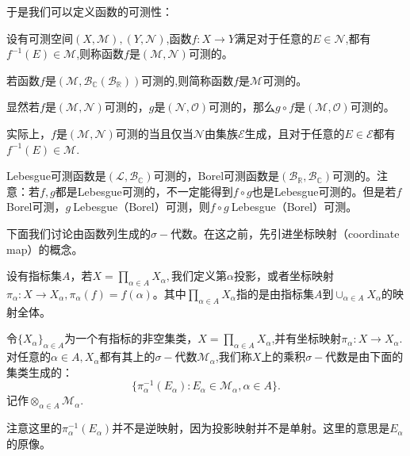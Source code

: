 \documentclass[lang=cn,10pt]{elegantbook}
\begin{document}
	于是我们可以定义函数的可测性：
	\begin{definition}[可测函数]
		设有可测空间\((X,\mathcal{M}),(Y,\mathcal{N})\),函数\(f:X\to Y\)满足对于任意的\(E\in \mathcal{N}\),都有\(f^{-1}(E)\in \mathcal{M}\),则称函数\(f\)是\((\mathcal{M},\mathcal{N})\)可测的。

		若函数\(f\)是\((\mathcal{M},\mathcal{B}_\mathbb{C}(\mathcal{B}_\mathbb{R}))\)可测的,则简称函数\(f\)是\(\mathcal{M}\)可测的。
	\end{definition}
	\begin{note}
		显然若\(f\)是\((\mathcal{M},\mathcal{N})\)可测的，\(g\)是\((\mathcal{N},\mathcal{O})\)可测的，那么\(g\circ f\)是\((\mathcal{M},\mathcal{O})\)可测的。

		实际上，\(f\)是\((\mathcal{M},\mathcal{N})\)可测的当且仅当\(\mathcal{N}\)由集族\(\mathcal{E}\)生成，且对于任意的\(E\in \mathcal{E}\)都有\(f^{-1}(E)\in \mathcal{M}\).
	\end{note}
	\begin{example}
		Lebesgue可测函数是\((\mathcal{L},\mathcal{B}_\mathbb{C})\)可测的，Borel可测函数是\((\mathcal{B}_\mathbb{R},\mathcal{B}_\mathbb{C})\)可测的。注意：若\(f,g\)都是Lebesgue可测的，不一定能得到\(f\circ g\)也是Lebesgue可测的。但是若\(f\ \)Borel可测，\(g\ \)Lebesgue（Borel）可测，则\(f\circ g\ \)Lebesgue（Borel）可测。
	\end{example}
	下面我们讨论由函数列生成的\(\sigma-\)代数。在这之前，先引进坐标映射（coordinate map）的概念。
	\begin{definition}[坐标映射]
		设有指标集\(A\)，若\(X=\prod_{\alpha\in A}X_\alpha,\)我们定义第\(\alpha\)投影，或者坐标映射\(\pi_\alpha:X\to X_\alpha,\pi_\alpha(f)=f(\alpha)\)。其中\(\prod_{\alpha\in A}X_\alpha\)指的是由指标集\(A\)到\(\cup_{\alpha\in A}X_\alpha\)的映射全体。
	\end{definition}
	\begin{definition}[乘积\(\sigma-\)代数]
		令\(\{X_\alpha\}_{\alpha\in A}\)为一个有指标的非空集类，\(X=\prod_{\alpha\in A}X_\alpha\),并有坐标映射\(\pi_\alpha:X\to X_\alpha\).对任意的\(\alpha\in A,X_\alpha\)都有其上的\(\sigma-\)代数\(\mathcal{M}_\alpha\),我们称\(X\)上的乘积\(\sigma-\)代数是由下面的集类生成的：
		\[\{\pi^{-1}_\alpha(E_\alpha):E_\alpha\in \mathcal{M}_\alpha,\alpha\in A\}.\]
		记作\(\otimes_{\alpha\in A}\mathcal{M}_\alpha\).
	\end{definition}
	\begin{note}
		注意这里的\(\pi^{-1}_\alpha(E_\alpha)\)并不是逆映射，因为投影映射并不是单射。这里的意思是\(E_\alpha\)的原像。
	\end{note}
\end{document}
